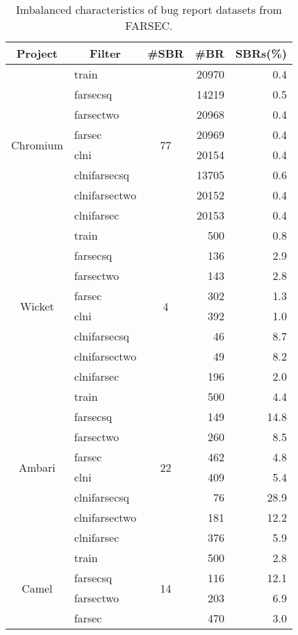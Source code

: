 \begin{table}[!htbp]
\caption {Imbalanced characteristics of bug report datasets from FARSEC.}
\small
\centering
\begin{tabular}{c|l|c|r|r}
\hline
\rowcolor[HTML]{EFEFEF} 
\textbf{Project} & \multicolumn{1}{c|}{\textbf{Filter}} & \textbf{\#SBR} & \multicolumn{1}{c|}{\textbf{\#BR}} & \multicolumn{1}{c}{\textbf{SBRs(\%)}} \\ \hline
\multirow{8}{*}{Chromium} & train & \multirow{8}{*}{77} & 20970 & 0.4 \\  
 & farsecsq &  & 14219 & 0.5 \\ 
 & farsectwo &  & 20968 & 0.4 \\  
 & farsec &  & 20969 & 0.4 \\  
 & clni &  & 20154 & 0.4 \\  
 & clnifarsecsq &  & 13705 & 0.6 \\  
 & clnifarsectwo &  & 20152 & 0.4 \\  
 & clnifarsec &  & 20153 & 0.4 \\ \hline
\multirow{8}{*}{Wicket} & train & \multirow{8}{*}{4} & 500 & 0.8 \\
 & farsecsq &  & 136 & 2.9 \\  
 & farsectwo &  & 143 & 2.8 \\  
 & farsec &  & 302 & 1.3 \\  
 & clni &  & 392 & 1.0 \\  
 & clnifarsecsq &  & 46 & 8.7 \\  
 & clnifarsectwo &  & 49 & 8.2 \\  
 & clnifarsec &  & 196 & 2.0 \\ \hline
\multirow{8}{*}{Ambari} & train & \multirow{8}{*}{22} & 500 & 4.4 \\  
 & farsecsq &  & 149 & 14.8 \\  
 & farsectwo &  & 260 & 8.5 \\  
 & farsec &  & 462 & 4.8 \\  
 & clni &  & 409 & 5.4 \\  
 & clnifarsecsq &  & 76 & 28.9 \\ 
 & clnifarsectwo &  & 181 & 12.2 \\  
 & clnifarsec &  & 376 & 5.9 \\ \hline
\multirow{8}{*}{Camel} & train & \multirow{8}{*}{14} & 500 & 2.8 \\  
 & farsecsq &  & 116 & 12.1 \\ 
 & farsectwo &  & 203 & 6.9 \\  
 & farsec &  & 470 & 3.0 \\  

\end{tabular}
\end{table}
